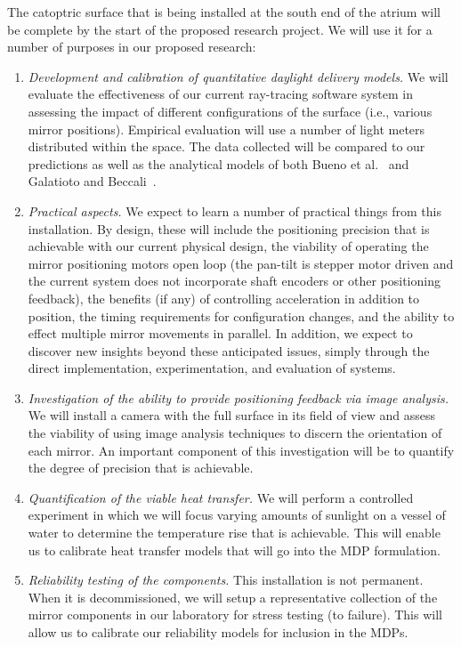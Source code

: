 The catoptric surface that is being installed at the south end of the
atrium will be complete by the start of the proposed research project.
We will use it for a number of purposes in our proposed research:
\begin{enumerate}

\item \emph{Development and calibration of quantitative daylight delivery models.}
We will evaluate the effectiveness of our current ray-tracing software
system in assessing the impact of different configurations of the surface
(i.e., various mirror positions).  Empirical evaluation will use a number
of light meters distributed within the space. The data collected will be
compared to our predictions as well as the analytical models
of both Bueno et al.~\cite{bwkk15} and Galatioto and Beccali~\cite{gb16}.

\item \emph{Practical aspects.}  We expect to learn a number of
  practical things from this installation. By design, these will
  include the positioning precision that is achievable with our
  current physical design, the viability of operating the mirror
  positioning motors open loop (the pan-tilt is stepper motor driven
  and the current system does not incorporate shaft encoders or other
  positioning feedback), the benefits (if any) of controlling
  acceleration in addition to position, the timing requirements for
  configuration changes, and the ability to effect multiple mirror
  movements in parallel. In addition, we expect to discover new insights
  beyond these anticipated issues, simply through the direct implementation, 
  experimentation, and evaluation of systems.

\item \emph{Investigation of the ability to provide positioning feedback via
image analysis.}  We will install a camera with the full surface in its
field of view and assess the viability of using image analysis techniques
to discern the orientation of each mirror.  An important component of this
investigation will be to quantify the degree of precision that is achievable.

\item \emph{Quantification of the viable heat transfer.}
We will perform a controlled experiment in which we will focus varying
amounts of sunlight on a vessel of water to determine the temperature
rise that is achievable.  This will enable us to calibrate heat transfer
models that will go into the MDP formulation.

\item \emph{Reliability testing of the components.}
This installation is not permanent. When it is decommissioned, we will
setup a representative collection of the mirror components in our laboratory
for stress testing (to failure).  This will allow us to calibrate our
reliability models for inclusion in the MDPs.

\end{enumerate}

